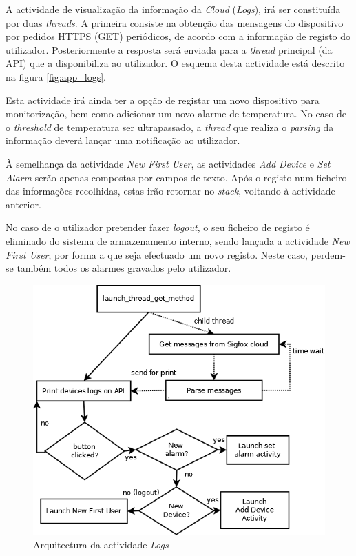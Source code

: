 \documentclass[a4paper]{article}
\begin{document}
A actividade de visualização da informação da \textit{Cloud} (\textit{Logs}), irá ser constituída por duas \textit{threads}. A primeira consiste na obtenção das mensagens do dispositivo por pedidos HTTPS (GET) periódicos, de acordo com a informação de registo do utilizador. Posteriormente a resposta será enviada para a \textit{thread} principal (da API) que a disponibiliza ao utilizador. O esquema desta actividade está descrito na figura \autoref{fig:app_logs}.

Esta actividade irá ainda ter a opção de registar um novo dispositivo para monitorização, bem como adicionar um novo alarme de temperatura. No caso de o \textit{threshold} de temperatura ser ultrapassado, a \textit{thread} que realiza o \textit{parsing} da informação deverá lançar uma notificação ao utilizador.

À semelhança da actividade \textit{New First User}, as actividades \textit{Add Device} e \textit{Set Alarm} serão apenas compostas por campos de texto. Após o registo num ficheiro das informações recolhidas, estas irão retornar no \textit{stack}, voltando à actividade anterior.

No caso de o utilizador pretender fazer \textit{logout}, o seu ficheiro de registo é eliminado do sistema de armazenamento interno, sendo lançada a actividade \textit{New First User}, por forma a que seja efectuado um novo registo. Neste caso, perdem-se também todos os alarmes gravados pelo utilizador.

\begin{figure}[H]
  \centering
  \includegraphics[scale=0.40]{ShowLogs.png}
  \caption{Arquitectura da actividade \textit{Logs}}
  \label{fig:app_logs}
\end{figure}
\end{document}
